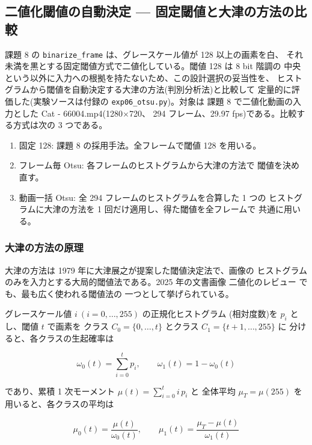 \subsection{二値化閾値の自動決定 --- 固定閾値と大津の方法の比較}

課題 8 の {\tt binarize\_frame} は、グレースケール値が 128 以上の画素を白、
それ未満を黒とする固定閾値方式で二値化している。閾値 128 は 8 bit 階調の
中央という以外に入力への根拠を持たないため、この設計選択の妥当性を、
ヒストグラムから閾値を自動決定する大津の方法(判別分析法)と比較して
定量的に評価した(実験ソースは付録の {\tt exp06\_otsu.py})。対象は
課題 8 で二値化動画の入力とした Cat - 66004.mp4(1280$\times$720、
294 フレーム、29.97 fps)である。比較する方式は次の 3 つである。

\begin{enumerate}
\item 固定 128: 課題 8 の採用手法。全フレームで閾値 128 を用いる。
\item フレーム毎 Otsu: 各フレームのヒストグラムから大津の方法で
      閾値を決め直す。
\item 動画一括 Otsu: 全 294 フレームのヒストグラムを合算した 1 つの
      ヒストグラムに大津の方法を 1 回だけ適用し、得た閾値を全フレームで
      共通に用いる。
\end{enumerate}

\subsubsection{大津の方法の原理}

大津の方法は 1979 年に大津展之が提案した閾値決定法で、画像の
ヒストグラムのみを入力とする大局的閾値法である。2025 年の文書画像
二値化のレビュー \cite{b6-binreview} でも、最も広く使われる閾値法の
一つとして挙げられている。

グレースケール値 $i\ (i = 0, \ldots, 255)$ の正規化ヒストグラム
(相対度数)を $p_i$ とし、閾値 $t$ で画素を
クラス $C_0 = \{0, \ldots, t\}$ とクラス $C_1 = \{t+1, \ldots, 255\}$ に
分けると、各クラスの生起確率は

\begin{equation}\label{eq:b6-omega}
\omega_0(t) = \sum_{i=0}^{t} p_i, \qquad
\omega_1(t) = 1 - \omega_0(t)
\end{equation}

であり、累積 1 次モーメント $\mu(t) = \sum_{i=0}^{t} i\,p_i$ と
全体平均 $\mu_T = \mu(255)$ を用いると、各クラスの平均は

\begin{equation}\label{eq:b6-mu}
\mu_0(t) = \frac{\mu(t)}{\omega_0(t)}, \qquad
\mu_1(t) = \frac{\mu_T - \mu(t)}{\omega_1(t)}
\end{equation}

